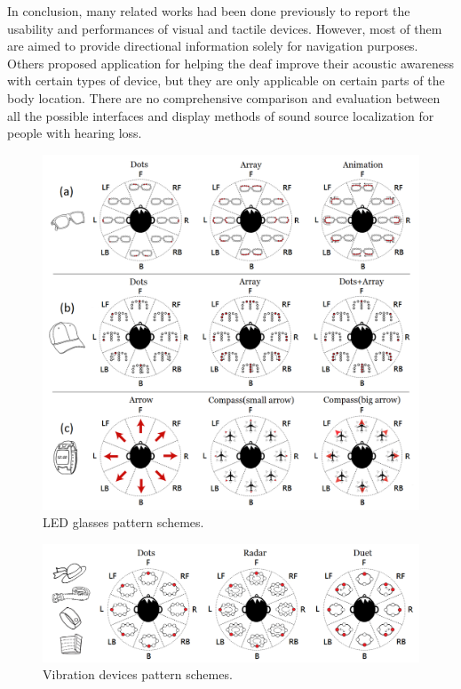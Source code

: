 \documentclass{sigchi}
\begin{document}
In conclusion, many related works had been done previously to report the usability and performances of visual and tactile devices. However, most of them are aimed to provide directional information solely for navigation purposes. Others proposed application for helping the deaf improve their acoustic awareness with certain types of device, but they are only applicable on certain parts of the body location. There are no comprehensive comparison and evaluation between all the possible interfaces and display methods of sound source localization for people with hearing loss.

\begin{figure}[!t]
\centering
\includegraphics[width=2.15\columnwidth]{visual_pattern_combine}
\caption{LED glasses pattern schemes.}
\label{fig:all_scheme}
\end{figure}

%
%
\begin{figure}[!t]
\centering
\includegraphics[width=2.15\columnwidth]{vibration_pattern_combine2}
\caption{Vibration devices pattern schemes.}
\label{fig:vibratin_scheme}
\end{figure}
\end{document}

